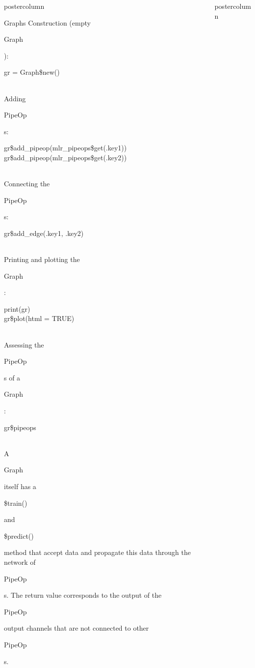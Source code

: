 \documentclass{beamer}
\newlength{\columnheight} %
\newcommand{\codeinline}[1]{\begin{codeboxinline}#1\end{codeboxinline}}
\begin{document}
\begin{frame}[fragile]{}
\begin{columns}
\begin{column}{.245\textwidth}
\begin{beamercolorbox}[center]{postercolumn}
\begin{minipage}{.98\textwidth}
{\begin{myblock}{Graphs}
              Construction (empty \codeinline{Graph}):
              \begin{codebox}
                gr = Graph\$new()
              \end{codebox}
              \ \\
              Adding \codeinline{PipeOp}s:
              \begin{codeboxmultiline}[width=25cm]
                gr\$add\_pipeop(mlr\_pipeops\$get(.key1))\\
                gr\$add\_pipeop(mlr\_pipeops\$get(.key2))
              \end{codeboxmultiline}
              \ \\
              Connecting the \codeinline{PipeOp}s:
              \begin{codebox}
                gr\$add\_edge(.key1, .key2)
              \end{codebox}
              \ \\
              Printing and plotting the \codeinline{Graph}:
              \begin{codeboxmultiline}[width=13cm]
                print(gr)\\
                gr\$plot(html = TRUE)
              \end{codeboxmultiline}
              \ \\
              Assessing the \codeinline{PipeOp}s of a \codeinline{Graph}:
              \begin{codebox}
                gr\$pipeops
              \end{codebox}
              \ \\
              A \codeinline{Graph} itself has a \codeinline{\$train()} and \codeinline{\$predict()} method that accept data and propagate this data through the network of \codeinline{PipeOp}s. The return value corresponds to the output of the \codeinline{PipeOp} output channels that are not connected to other \codeinline{PipeOp}s.\\
						\end{myblock}
						\vfill}
				\end{minipage}
			\end{beamercolorbox}
		\end{column}
		\begin{column}{.245\textwidth}
			\begin{beamercolorbox}[center]{postercolumn}
				\begin{minipage}{.98\textwidth}
					\parbox[t][\columnheight]{\textwidth}{
}
\end{minipage}
\end{beamercolorbox}
\end{column}
\end{columns}
\end{frame}
\end{document}
